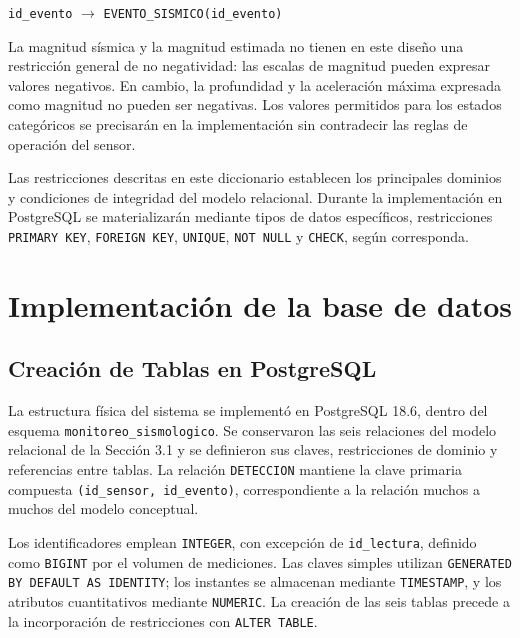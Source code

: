 \documentclass[12pt,a4paper]{article}
\begin{document}
\noindent
\texttt{id\_\allowbreak{}evento}
$\rightarrow$
\texttt{EVENTO\_\allowbreak{}SISMICO(id\_\allowbreak{}evento)}

La magnitud sísmica y la magnitud estimada no tienen en este diseño una restricción general de no negatividad: las escalas de magnitud pueden expresar valores negativos. En cambio, la profundidad y la aceleración máxima expresada como magnitud no pueden ser negativas. Los valores permitidos para los estados categóricos se precisarán en la implementación sin contradecir las reglas de operación del sensor.

Las restricciones descritas en este diccionario establecen los principales dominios y condiciones de integridad del modelo relacional. Durante la implementación en PostgreSQL se materializarán mediante tipos de datos específicos, restricciones \texttt{PRIMARY KEY}, \texttt{FOREIGN KEY}, \texttt{UNIQUE}, \texttt{NOT NULL} y \texttt{CHECK}, según corresponda.

\clearpage
\section{Implementación de la base de datos}

\subsection{Creación de Tablas en PostgreSQL}

La estructura física del sistema se implementó en PostgreSQL 18.6, dentro
 del esquema \texttt{monitoreo\_sismologico}. Se conservaron las seis
 relaciones del modelo relacional de la Sección 3.1 y se definieron sus
 claves, restricciones de dominio y referencias entre tablas. La relación
 \texttt{DETECCION} mantiene la clave primaria compuesta
 \texttt{(id\_sensor, id\_evento)}, correspondiente a la relación
 muchos a muchos del modelo conceptual.

Los identificadores emplean \texttt{INTEGER}, con excepción de
 \texttt{id\_lectura}, definido como \texttt{BIGINT} por el volumen de
 mediciones. Las claves simples utilizan \texttt{GENERATED BY DEFAULT AS
 IDENTITY}; los instantes se almacenan mediante \texttt{TIMESTAMP}, y
 los atributos cuantitativos mediante \texttt{NUMERIC}. La creación
 de las seis tablas precede a la incorporación de restricciones con
 \texttt{ALTER TABLE}.
\end{document}
